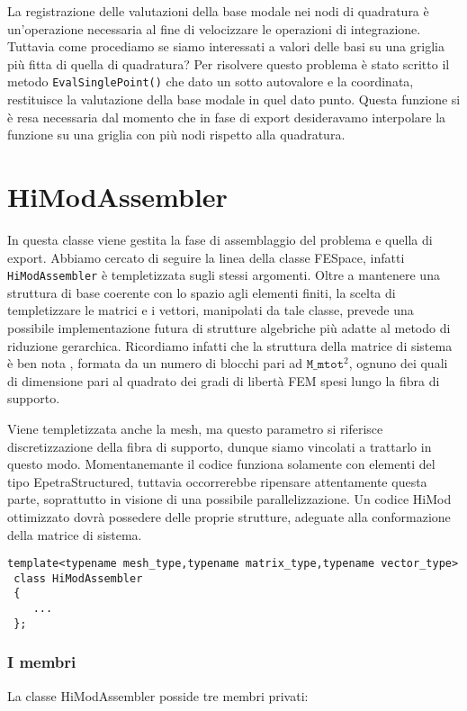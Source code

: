La registrazione delle valutazioni della base modale nei nodi di quadratura \`e un'operazione necessaria al fine di velocizzare le operazioni di integrazione. Tuttavia come procediamo se siamo interessati a valori delle basi su una griglia pi\`u fitta di quella di quadratura? Per risolvere questo problema \`e stato scritto il metodo \texttt{EvalSinglePoint()} che dato un sotto autovalore e la coordinata, restituisce la valutazione della base modale in quel dato punto. Questa funzione si \`e resa necessaria dal momento che in fase di export desideravamo interpolare la funzione su una griglia con pi\`u nodi rispetto alla quadratura.

\section{HiModAssembler}
 
 In questa classe viene gestita la fase di assemblaggio del problema e quella di export. Abbiamo cercato di seguire la linea della classe FESpace, infatti \texttt{HiModAssembler} \`e templetizzata sugli stessi argomenti. Oltre a mantenere una struttura di base coerente con lo spazio agli elementi finiti, la scelta di templetizzare le matrici e i vettori, manipolati da tale classe, prevede una possibile implementazione futura di strutture algebriche pi\`u adatte al metodo di riduzione gerarchica. Ricordiamo infatti che la struttura della matrice di sistema \`e ben nota  , formata da un numero di blocchi pari ad $\texttt{M\_mtot}^2$, ognuno dei quali di dimensione pari al quadrato dei gradi di libert\`a FEM spesi lungo la fibra di supporto.
 

 
 Viene templetizzata anche la mesh, ma questo parametro si riferisce discretizzazione della fibra di supporto, dunque siamo vincolati a trattarlo in questo modo.
 Momentanemante il codice funziona solamente con elementi del tipo EpetraStructured, tuttavia occorrerebbe ripensare attentamente questa parte, soprattutto in visione di una possibile parallelizzazione.
Un codice HiMod ottimizzato dovr\`a possedere delle proprie strutture, adeguate alla conformazione della matrice di sistema.

 \begin{lstlisting}[style = general]
 template<typename mesh_type,typename matrix_type,typename vector_type>
 class HiModAssembler
 {
	... 
 };
 \end{lstlisting}
 
\subsubsection{I membri}
La classe HiModAssembler posside tre membri privati:


